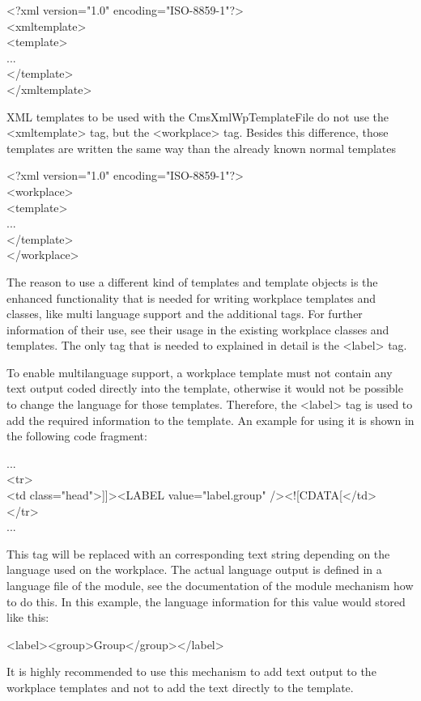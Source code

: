 \begin{xml}
<?xml version="1.0" encoding="ISO-8859-1"?>\\
<xmltemplate>\\
\xtaba  <template>\\
\xtaba   ...\\
\xtaba  </template>\\
</xmltemplate>\\
\end{xml}

XML templates to be used with the {\name CmsXmlWpTemplateFile} do not use the
{\tag <xmltemplate>} tag, but the {\tag <workplace>} tag. Besides this difference,
those templates are written the same way than the already known normal
templates

\begin{xml}
<?xml version="1.0" encoding="ISO-8859-1"?>\\
<workplace>\\
\xtaba  <template>\\
...\\
\xtaba  </template>\\
</workplace>\\
\end{xml}

The reason to use a different kind of templates and template objects is
the enhanced functionality that is needed for writing workplace
templates and classes, like multi language support and the additional
tags. For further information of their use, see their usage in the
existing workplace classes and templates. The only tag that is needed
to explained in detail is the <label> tag.

To enable multilanguage support, a workplace template must not contain
any text output coded directly into the template, otherwise it would not
be possible  to change the language for those templates. Therefore, the
{\tag <label>} tag is used to add the required information to the template. An
example for using it is shown in the following code fragment:

\begin{java}
...\\
<tr>\\
<td class="head">]]><LABEL value="label.group" /><![CDATA[</td>\\
</tr>\\
...\\
\end{java}

This tag will be replaced with an corresponding text string depending on
the language used on the workplace. The actual language output is
defined in a language file of the module, see the documentation of the
module mechanism how to do this. In this example, the language
information for this value would stored like this:
\begin{java}
<label><group>Group</group></label>\\
\end{java}
It is highly recommended to use this mechanism to add text output to the
workplace templates and not to add the text directly to the template.

